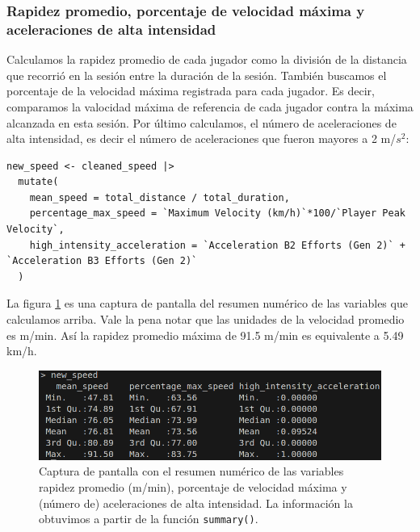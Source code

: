 \subsubsection*{Rapidez promedio, porcentaje de velocidad máxima y aceleraciones de alta intensidad}
Calculamos la rapidez promedio de cada jugador como la división de la distancia que recorrió en la
sesión entre la duración de la sesión. También buscamos el porcentaje de la velocidad máxima
registrada para cada jugador. Es decir, comparamos la valocidad máxima de referencia de cada jugador
contra la máxima alcanzada en esta sesión. Por último calculamos, el número de aceleraciones de alta
intensidad, es decir el número de aceleraciones que fueron mayores a 2 m/$s^2$:
\begin{verbatim}
new_speed <- cleaned_speed |>
  mutate(
    mean_speed = total_distance / total_duration,
    percentage_max_speed = `Maximum Velocity (km/h)`*100/`Player Peak Velocity`,
    high_intensity_acceleration = `Acceleration B2 Efforts (Gen 2)` + `Acceleration B3 Efforts (Gen 2)`
  )
\end{verbatim}
La figura \ref{fig:numericSummary} es una captura de pantalla del resumen numérico de las variables
que calculamos arriba. Vale la pena notar que las unidades de la velocidad promedio es m/min. Así la
rapidez promedio máxima de 91.5 m/min es equivalente a 5.49 km/h.
\begin{figure}[H]
\centering
\includegraphics[scale=0.6]{../static/activity_1_8.png}
\caption{Captura de pantalla con el resumen numérico de las variables rapidez promedio (m/min),
porcentaje de velocidad máxima y (número de) aceleraciones de alta intensidad. La información la
obtuvimos a partir de la función \texttt{summary()}.}
\label{fig:numericSummary}
\end{figure}

